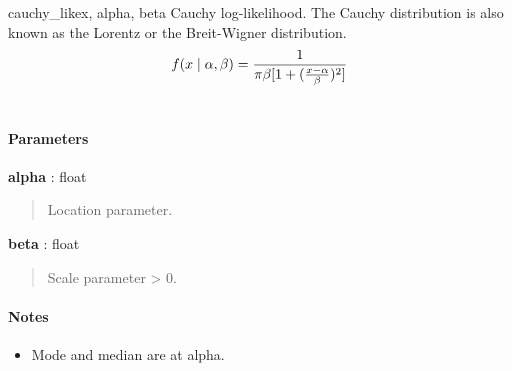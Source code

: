\hypertarget{pymc.distributions.cauchy_like}{}
\begin{funcdesc}{cauchy\_like}{x, alpha, beta}
Cauchy log-likelihood. The Cauchy distribution is also known as the
Lorentz or the Breit-Wigner distribution.
\begin{gather}
\begin{split}f(x \mid \alpha, \beta) = \frac{1}{\pi \beta [1 + (\frac{x-\alpha}{\beta})^2]}\end{split}\notag\\\begin{split}\end{split}\notag
\end{gather}
\paragraph{Parameters}
\begin{paramlist}
\item[] \textbf{alpha} : float
\begin{quote}

Location parameter.
\end{quote}

\item[] \textbf{beta} : float
\begin{quote}

Scale parameter \textgreater{} 0.
\end{quote}
\end{paramlist}
\paragraph{Notes}
\begin{itemize}
\item {} 
Mode and median are at alpha.

\end{itemize}
\end{funcdesc}

